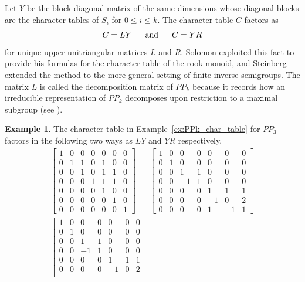 \documentclass{amsart}
\theoremstyle{definition}
\newtheorem{example}[lemma]{Example}
\newcommand{\PP}{P\!P}
\begin{document}
Let $Y$ be the block diagonal matrix of the same dimensions
whose diagonal blocks are the character tables of $S_i$
for $0\leq i\leq k$.
The character table $C$ factors as
\[C=LY~~~~~\hbox{and}~~~~~C=YR\]
for unique upper unitriangular matrices $L$ and $R$.
Solomon \cite{solomon2002rep} exploited this fact to provide his formulas for the character
table of the rook monoid, and Steinberg \cite{steinberg_mobius} extended the method to the 
more general setting of finite inverse semigroups.
The matrix $L$ is called the decomposition matrix of $\PP_k$
because it records how an irreducible representation of
$\PP_k$ decomposes upon restriction to a maximal subgroup (see \cite[Theorem 6.5]{steinberg}).

\begin{example}
The character table in Example~\ref{ex:PPk_char_table} for $\PP_3$ factors in the following two ways
as $LY$ and $YR$ respectively.
	\begin{align*}
\left[\begin{array}{rrrrrrr}
1 & 0 & 0 & 0 & 0 & 0 & 0 \\
0 & 1 & 1 & 0 & 1 & 0 & 0 \\
0 & 0 & 1 & 0 & 1 & 1 & 0 \\
0 & 0 & 0 & 1 & 1 & 1 & 0 \\
0 & 0 & 0 & 0 & 1 & 0 & 0 \\
0 & 0 & 0 & 0 & 0 & 1 & 0 \\
0 & 0 & 0 & 0 & 0 & 0 & 1
\end{array}\right]&
\left[\begin{array}{rrrrrrr}
1 & 0 & 0 & 0 & 0 & 0 & 0 \\
 0 & 1 & 0 & 0 & 0 & 0 & 0 \\
 0 & 0 & 1 & 1 & 0 & 0 & 0 \\
0 & 0 & -1 & 1 & 0 & 0 & 0 \\
 0 & 0 & 0 & 0 & 1 & 1 & 1 \\
0 & 0 & 0 & 0 & -1 & 0 & 2 \\
0 & 0 & 0 & 0 & 1 & -1 & 1
\end{array}\right]\\
\left[\begin{array}{rrrrrrr}
1 & 0 & 0 & 0 & 0 & 0 & 0 \\
 0 & 1 & 0 & 0 & 0 & 0 & 0 \\
 0 & 0 & 1 & 1 & 0 & 0 & 0 \\
0 & 0 & -1 & 1 & 0 & 0 & 0 \\
 0 & 0 & 0 & 0 & 1 & 1 & 1 \\
0 & 0 & 0 & 0 & -1 & 0 & 2 \\

\end{array}
\end{align*}
\end{example}
\end{document}
